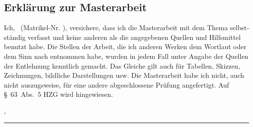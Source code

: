 %
\begin{otherlanguage}{ngerman}

\chapter*{Erklärung zur Masterarbeit}%
\label{sec:declaration}
\thispagestyle{empty}

Ich, \thesisName\ (Matrikel-Nr. \thesisMatNr), versichere, dass ich die Masterarbeit mit dem Thema \textit{\thesisTitle} selbstständig verfasst und keine anderen als die angegebenen Quellen und Hilfsmittel benutzt habe.
Die Stellen der Arbeit, die ich anderen Werken dem Wortlaut oder dem Sinn nach entnommen habe, wurden in jedem Fall unter Angabe der Quellen der Entlehnung kenntlich gemacht.
Das Gleiche gilt auch für Tabellen, Skizzen, Zeichnungen, bildliche Darstellungen usw.
Die Masterarbeit habe ich nicht, auch nicht auszugsweise, für eine andere abgeschlossene Prüfung angefertigt.
Auf §~63~Abs.~5 HZG wird hingewiesen.

\bigskip

\noindent\textit{\thesisUniversityCity, \thesisDate}

\smallskip

\begin{flushright}
	\begin{minipage}{7cm}
		\rule{\textwidth}{1pt}
		\centering\thesisName\
	\end{minipage}
\end{flushright}

\clearpage
\newpage

\end{otherlanguage}
